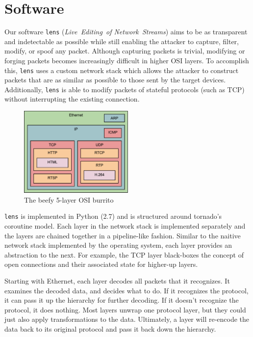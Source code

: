 \documentclass[12pt,notitlepage]{article}
\begin{document}
\section{Software}
Our software \texttt{lens} (\textit{Live~Editing~of Network~Streams}) aims to be as transparent and indetectable as possible while still enabling the attacker to capture, filter, modify, or spoof any packet. Although capturing packets is trivial, modifying or forging packets becomes increasingly difficult in higher OSI layers. To accomplish this, \texttt{lens} uses a custom network stack which allows the attacker to construct packets that are as similar as possible to those sent by the target devices. Additionally, \texttt{lens} is able to modify packets of stateful protocols (such as TCP) without interrupting the existing connection.
    
\begin{figure}[h]
    \centering
    \includegraphics[width=0.5\textwidth]{osi_layers}
    \caption{The beefy 5-layer OSI burrito}
\end{figure}

    \texttt{lens} is implemented in Python (2.7) and is structured around tornado’s coroutine model. Each layer in the network stack is implemented separately and the layers are chained together in a pipeline-like fashion. Similar to the naitive network stack implemented by the operating system, each layer provides an abstraction to the next. For example, the TCP layer black-boxes the concept of open connections and their associated state for higher-up layers.

Starting with Ethernet, each layer decodes all packets that it recognizes. It examines the decoded data, and decides what to do. If it recognizes the protocol, it can pass it up the hierarchy for further decoding. If it doesn’t recognize the protocol, it does nothing. Most layers unwrap one protocol layer, but they could just also apply transformations to the data. Ultimately, a layer will re-encode the data back to its original protocol and pass it back down the hierarchy.
\end{document}
